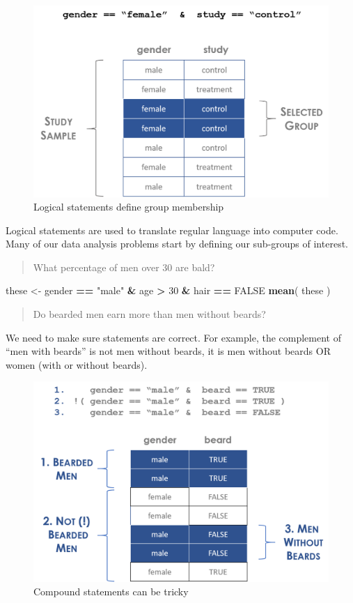 \documentclass[]{book}
\newenvironment{Shaded}{\begin{snugshade}}{\end{snugshade}}
\newcommand{\DecValTok}[1]{\textcolor[rgb]{0.00,0.00,0.81}{#1}}
\newcommand{\KeywordTok}[1]{\textcolor[rgb]{0.13,0.29,0.53}{\textbf{#1}}}
\newcommand{\NormalTok}[1]{#1}
\newcommand{\OperatorTok}[1]{\textcolor[rgb]{0.81,0.36,0.00}{\textbf{#1}}}
\newcommand{\OtherTok}[1]{\textcolor[rgb]{0.56,0.35,0.01}{#1}}
\newcommand{\StringTok}[1]{\textcolor[rgb]{0.31,0.60,0.02}{#1}}
\theoremstyle{definition}
\theoremstyle{definition}
\theoremstyle{definition}
\theoremstyle{remark}
\begin{document}
\begin{figure}

{\centering \includegraphics[width=0.7\linewidth]{figures/group_selection} 

}

\caption{Logical statements define group membership}\label{fig:unnamed-chunk-87}
\end{figure}

Logical statements are used to translate regular language into computer
code. Many of our data analysis problems start by defining our
sub-groups of interest.

\begin{quote}
What percentage of men over 30 are bald?
\end{quote}

\begin{Shaded}
\begin{Highlighting}[]
\NormalTok{these <-}\StringTok{ }\NormalTok{gender }\OperatorTok{==}\StringTok{ "male"} \OperatorTok{&}\StringTok{ }\NormalTok{age }\OperatorTok{>}\StringTok{ }\DecValTok{30} \OperatorTok{&}\StringTok{ }\NormalTok{hair }\OperatorTok{==}\StringTok{ }\OtherTok{FALSE}
\KeywordTok{mean}\NormalTok{( these )}
\end{Highlighting}
\end{Shaded}

\begin{quote}
Do bearded men earn more than men without beards?
\end{quote}

We need to make sure statements are correct. For example, the complement
of ``men with beards'' is not men without beards, it is men without
beards OR women (with or without beards).

\begin{figure}

{\centering \includegraphics[width=0.6\linewidth]{figures/bearded_men} 

}

\caption{Compound statements can be tricky}\label{fig:unnamed-chunk-89}
\end{figure}
\end{document}
